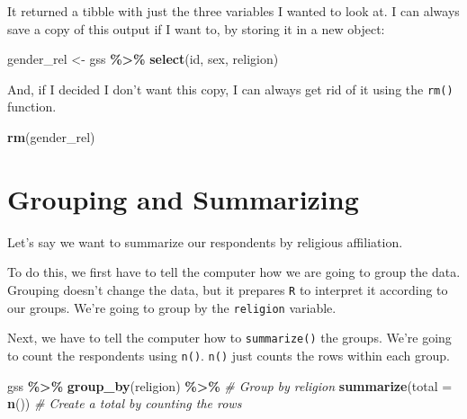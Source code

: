 \documentclass[
]{book}
\newenvironment{Shaded}{\begin{snugshade}}{\end{snugshade}}
\newcommand{\AttributeTok}[1]{\textcolor[rgb]{0.13,0.29,0.53}{#1}}
\newcommand{\CommentTok}[1]{\textcolor[rgb]{0.56,0.35,0.01}{\textit{#1}}}
\newcommand{\FunctionTok}[1]{\textcolor[rgb]{0.13,0.29,0.53}{\textbf{#1}}}
\newcommand{\NormalTok}[1]{#1}
\newcommand{\OtherTok}[1]{\textcolor[rgb]{0.56,0.35,0.01}{#1}}
\newcommand{\SpecialCharTok}[1]{\textcolor[rgb]{0.81,0.36,0.00}{\textbf{#1}}}
\begin{document}
It returned a tibble with just the three variables I wanted to look at. I can always save a copy of this output if I want to, by storing it in a new object:

\begin{Shaded}
\begin{Highlighting}[]
\NormalTok{gender\_rel }\OtherTok{\textless{}{-}}\NormalTok{ gss }\SpecialCharTok{\%\textgreater{}\%}
  \FunctionTok{select}\NormalTok{(id, sex, religion)}
\end{Highlighting}
\end{Shaded}

And, if I decided I don't want this copy, I can always get rid of it using the \texttt{rm()} function.

\begin{Shaded}
\begin{Highlighting}[]
\FunctionTok{rm}\NormalTok{(gender\_rel)}
\end{Highlighting}
\end{Shaded}

\hypertarget{grouping-and-summarizing}{%
\section{Grouping and Summarizing}\label{grouping-and-summarizing}}

Let's say we want to summarize our respondents by religious affiliation.

To do this, we first have to tell the computer how we are going to group the data. Grouping doesn't change the data, but it prepares \texttt{R} to interpret it according to our groups. We're going to group by the \texttt{religion} variable.

Next, we have to tell the computer how to \texttt{summarize()} the groups. We're going to count the respondents using \texttt{n()}. \texttt{n()} just counts the rows within each group.

\begin{Shaded}
\begin{Highlighting}[]
\NormalTok{gss }\SpecialCharTok{\%\textgreater{}\%}
  \FunctionTok{group\_by}\NormalTok{(religion) }\SpecialCharTok{\%\textgreater{}\%}      \CommentTok{\# Group by religion}
  \FunctionTok{summarize}\NormalTok{(}\AttributeTok{total =} \FunctionTok{n}\NormalTok{())      }\CommentTok{\# Create a total by counting the rows}
\end{Highlighting}
\end{Shaded}
\end{document}
